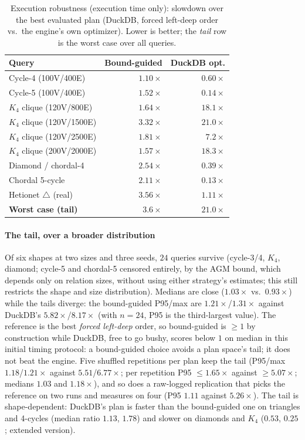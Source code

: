 \documentclass[conference]{IEEEtran}
\begin{document}
\begin{table}[t]
\centering
\caption{Execution robustness (execution time only): slowdown over the best evaluated plan
(DuckDB, forced left-deep order vs.\ the engine's own optimizer).
Lower is better; the \emph{tail} row is the worst case over all queries.}
\label{tab:robust}
\begin{tabular}{@{}lrr@{}}
\toprule
Query & Bound-guided & DuckDB opt. \\
\midrule
Cycle-4 (100V/400E)        & $1.10\times$ & $0.60\times$ \\
Cycle-5 (100V/400E)        & $1.52\times$ & $0.14\times$ \\
$K_4$ clique (120V/800E)      & $1.64\times$ & $18.1\times$ \\
$K_4$ clique (120V/1500E)     & $3.32\times$ & $21.0\times$ \\
$K_4$ clique (120V/2500E)     & $1.81\times$ & $7.2\times$ \\
$K_4$ clique (200V/2000E)     & $1.57\times$ & $18.3\times$ \\
Diamond / chordal-4        & $2.54\times$ & $0.39\times$ \\
Chordal 5-cycle            & $2.11\times$ & $0.13\times$ \\
Hetionet $\triangle$ (real)& $3.56\times$ & $1.11\times$ \\
\midrule
\textbf{Worst case (tail)} & $\mathbf{3.6\times}$ & $\mathbf{21.0\times}$ \\
\bottomrule
\end{tabular}
\end{table}

\paragraph{The tail, over a broader distribution}
Of six shapes at two sizes and three seeds, $24$ queries survive
(cycle-3/4, $K_4$, diamond; cycle-5 and chordal-5 censored entirely, by
the AGM bound, which depends only on relation sizes, without using either strategy's estimates; this still restricts the shape and size distribution). Medians are close
($1.03\times$ vs.\ $0.93\times$) while the tails diverge: the
bound-guided P95/max are $1.21\times$/$1.31\times$ against DuckDB's
$5.82\times$/$8.17\times$ (with $n{=}24$, P95 is the third-largest
value). The reference is the best \emph{forced left-deep} order, so
bound-guided is ${\ge}1$ by construction while DuckDB, free to go bushy, scores below $1$ on median in this initial timing protocol: a bound-guided choice avoids a plan space's tail; it does not beat the engine. Five shuffled repetitions per plan keep the tail (P95/max $1.18$/$1.21\times$ against $5.51$/$6.77\times$; per repetition P95 ${\le}1.65\times$ against ${\ge}5.07\times$; medians $1.03$ and $1.18\times$), and so does a raw-logged replication that picks the reference on two runs and measures on four (P95 $1.11$ against $5.26\times$). The tail is shape-dependent: DuckDB's plan is faster than the bound-guided one on triangles and 4-cycles (median ratio $1.13$, $1.78$) and slower on diamonds and $K_4$ ($0.53$, $0.25$; extended version).
\end{document}
